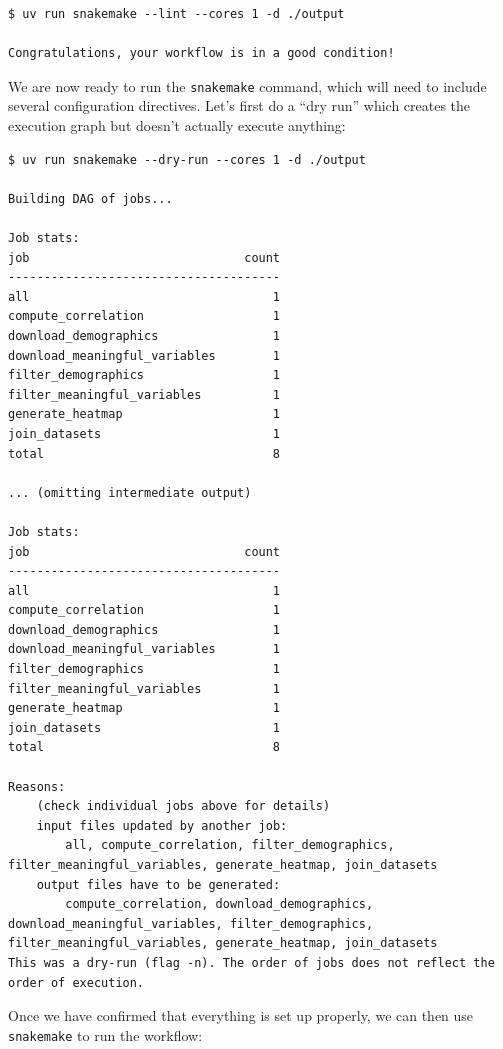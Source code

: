 \begin{lstlisting}[style=shell, numbers=none]
$ uv run snakemake --lint --cores 1 -d ./output

Congratulations, your workflow is in a good condition!
\end{lstlisting}

We are now ready to run the \texttt{snakemake} command, which will need to include several configuration directives. Let's first do a ``dry run'' which creates the execution graph but doesn't actually execute anything:

\begin{lstlisting}[style=shell]
$ uv run snakemake --dry-run --cores 1 -d ./output

Building DAG of jobs...

Job stats:
job                              count
--------------------------------------
all                                  1
compute_correlation                  1
download_demographics                1
download_meaningful_variables        1
filter_demographics                  1
filter_meaningful_variables          1
generate_heatmap                     1
join_datasets                        1
total                                8

... (omitting intermediate output)

Job stats:
job                              count
--------------------------------------
all                                  1
compute_correlation                  1
download_demographics                1
download_meaningful_variables        1
filter_demographics                  1
filter_meaningful_variables          1
generate_heatmap                     1
join_datasets                        1
total                                8

Reasons:
    (check individual jobs above for details)
    input files updated by another job:
        all, compute_correlation, filter_demographics, filter_meaningful_variables, generate_heatmap, join_datasets
    output files have to be generated:
        compute_correlation, download_demographics, download_meaningful_variables, filter_demographics, filter_meaningful_variables, generate_heatmap, join_datasets
This was a dry-run (flag -n). The order of jobs does not reflect the order of execution.
\end{lstlisting}

Once we have confirmed that everything is set up properly, we can then use \texttt{snakemake} to run the workflow:

